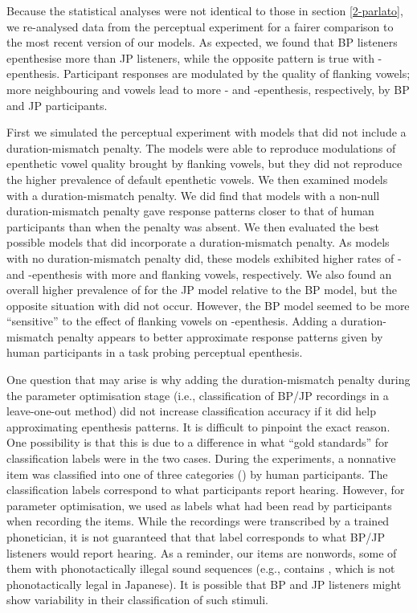 Because the statistical analyses were not identical to those in section \ref{2-parlato}, we re-analysed data from the perceptual experiment for a fairer comparison to the most recent version of our models. As expected, we found that BP listeners epenthesise more  than JP listeners, while the opposite pattern is true with -epenthesis. Participant responses are modulated by the quality of flanking vowels; more neighbouring  and  vowels lead to more - and -epenthesis, respectively, by BP and JP participants.

First we simulated the perceptual experiment with models that did not include a duration-mismatch penalty. The models were able to reproduce modulations of epenthetic vowel quality brought by flanking vowels, but they did not reproduce the higher prevalence of default epenthetic vowels.
We then examined models with a duration-mismatch penalty. We did find that models with a non-null duration-mismatch penalty gave response patterns closer to that of human participants than when the penalty was absent. We then evaluated the best possible models that did incorporate a duration-mismatch penalty. As models with no duration-mismatch penalty did, these models exhibited higher rates of - and -epenthesis with more  and  flanking vowels, respectively. We also found an overall higher prevalence of  for the JP model relative to the BP model, but the opposite situation with  did not occur. However, the BP model seemed to be more ``sensitive'' to the effect of  flanking vowels on -epenthesis. Adding a duration-mismatch penalty appears to better approximate response patterns given by human participants in a task probing perceptual epenthesis.  

One question that may arise is why adding the duration-mismatch penalty during the parameter optimisation stage (i.e., classification of BP/JP recordings in a leave-one-out method) did not increase classification accuracy if it did help approximating epenthesis patterns. It is difficult to pinpoint the exact reason. One possibility is that this is due to a difference in what ``gold standards'' for classification labels were in the two cases. During the experiments, a nonnative item was classified into one of three categories () by human participants. The classification labels correspond to what participants report hearing. However, for parameter optimisation, we used as labels what had been read by participants when recording the items. While the recordings were transcribed by a trained phonetician, it is not guaranteed that that label corresponds to what BP/JP listeners would report hearing. As a reminder, our items are nonwords, some of them with phonotactically illegal sound sequences (e.g.,  contains , which is not phonotactically legal in Japanese). It is possible that BP and JP listeners might show variability in their classification of such stimuli.    

